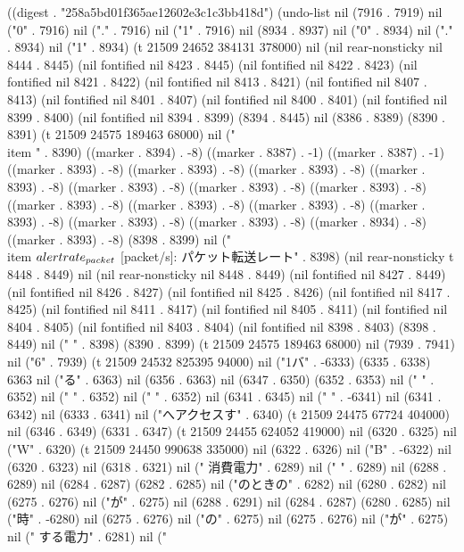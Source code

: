 
((digest . "258a5bd01f365ae12602e3c1c3bb418d") (undo-list nil (7916 . 7919) nil ("0" . 7916) nil ("." . 7916) nil ("1" . 7916) nil (8934 . 8937) nil ("0" . 8934) nil ("." . 8934) nil ("1" . 8934) (t 21509 24652 384131 378000) nil (nil rear-nonsticky nil 8444 . 8445) (nil fontified nil 8423 . 8445) (nil fontified nil 8422 . 8423) (nil fontified nil 8421 . 8422) (nil fontified nil 8413 . 8421) (nil fontified nil 8407 . 8413) (nil fontified nil 8401 . 8407) (nil fontified nil 8400 . 8401) (nil fontified nil 8399 . 8400) (nil fontified nil 8394 . 8399) (8394 . 8445) nil (8386 . 8389) (8390 . 8391) (t 21509 24575 189463 68000) nil ("
  \\item " . 8390) ((marker . 8394) . -8) ((marker . 8387) . -1) ((marker . 8387) . -1) ((marker . 8393) . -8) ((marker . 8393) . -8) ((marker . 8393) . -8) ((marker . 8393) . -8) ((marker . 8393) . -8) ((marker . 8393) . -8) ((marker . 8393) . -8) ((marker . 8393) . -8) ((marker . 8393) . -8) ((marker . 8393) . -8) ((marker . 8393) . -8) ((marker . 8393) . -8) ((marker . 8393) . -8) ((marker . 8934) . -8) ((marker . 8393) . -8) (8398 . 8399) nil ("\\item $\\alert{rate_{packet}}$ [packet/s]: パケット転送レート" . 8398) (nil rear-nonsticky t 8448 . 8449) nil (nil rear-nonsticky nil 8448 . 8449) (nil fontified nil 8427 . 8449) (nil fontified nil 8426 . 8427) (nil fontified nil 8425 . 8426) (nil fontified nil 8417 . 8425) (nil fontified nil 8411 . 8417) (nil fontified nil 8405 . 8411) (nil fontified nil 8404 . 8405) (nil fontified nil 8403 . 8404) (nil fontified nil 8398 . 8403) (8398 . 8449) nil (" " . 8398) (8390 . 8399) (t 21509 24575 189463 68000) nil (7939 . 7941) nil ("6" . 7939) (t 21509 24532 825395 94000) nil ("1バ" . -6333) (6335 . 6338) 6363 nil ("る" . 6363) nil (6356 . 6363) nil (6347 . 6350) (6352 . 6353) nil (" " . 6352) nil (" " . 6352) nil ("
" . 6352) nil (6341 . 6345) nil ("
" . -6341) nil (6341 . 6342) nil (6333 . 6341) nil ("へアクセスす" . 6340) (t 21509 24475 67724 404000) nil (6346 . 6349) (6331 . 6347) (t 21509 24455 624052 419000) nil (6320 . 6325) nil ("W" . 6320) (t 21509 24450 990638 335000) nil (6322 . 6326) nil ("B" . -6322) nil (6320 . 6323) nil (6318 . 6321) nil ("  消費電力" . 6289) nil ("
" . 6289) nil (6288 . 6289) nil (6284 . 6287) (6282 . 6285) nil ("のときの" . 6282) nil (6280 . 6282) nil (6275 . 6276) nil ("が" . 6275) nil (6288 . 6291) nil (6284 . 6287) (6280 . 6285) nil ("時" . -6280) nil (6275 . 6276) nil ("の" . 6275) nil (6275 . 6276) nil ("が" . 6275) nil ("  する電力" . 6281) nil ("
